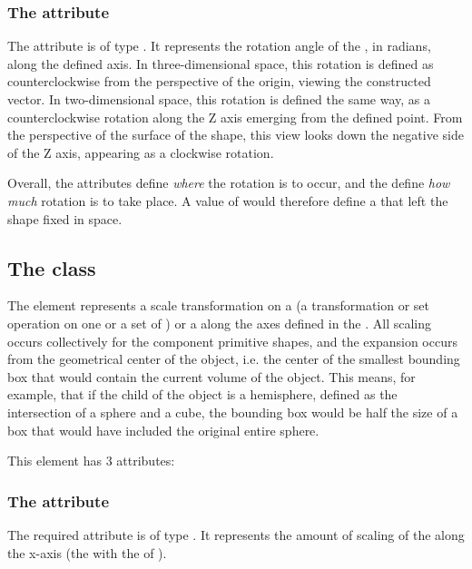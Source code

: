 \subsubsection{The \fixttspace{} attribute}
The  attribute is of type . It represents the rotation angle of the \CSGNode, in radians, along the defined axis.  In three-dimensional space, this rotation is defined as counterclockwise from the perspective of the origin, viewing the constructed vector.  In two-dimensional space, this rotation is defined the same way, as a counterclockwise rotation along the Z axis emerging from the defined point.  From the perspective of the surface of the shape, this view looks down the negative side of the Z axis, appearing as a clockwise rotation.

Overall, the  attributes define \emph{where} the rotation is to occur, and the  define \emph{how much} rotation is to take place.  A  value of  would therefore define a \CSGRotation that left the shape fixed in space.


\subsection{The  class}
\label{csgscale-class}
The \CSGScale element represents a scale transformation on a \CSGNode (a transformation or set operation on one or a set of \CSGPrimitives) or a \CSGPrimitive along the axes defined in the \Geometry.  All scaling occurs collectively for the component primitive shapes, and the expansion occurs from the geometrical center of the object, i.e. the center of the smallest bounding box that would contain the current volume of the object.  This means, for example, that if the child of the \CSGScale object is a hemisphere, defined as the intersection of a sphere and a cube, the bounding box would be half the size of a box that would have included the original entire sphere.

This element has 3 attributes:

\subsubsection{The \fixttspace{} attribute}
The  required attribute is of type . It represents the amount of scaling of the \CSGNode along the x-axis (the \CoordinateComponent with the  of ).

